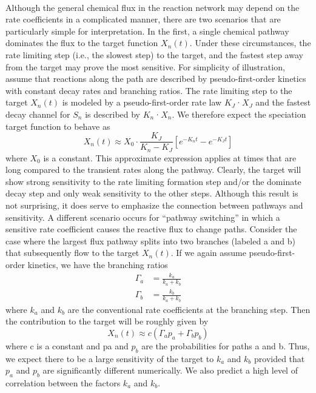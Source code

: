 \paragraph{}
Although the general chemical flux in the reaction network
may depend on the rate coefficients in a complicated manner,
there are two scenarios that are particularly simple for
interpretation. In the first, a single chemical pathway dominates
the flux to the target function $X_n(t)$. Under these circumstances,
the rate limiting step (i.e., the slowest step) to the target, and
the fastest step away from the target may prove the most
sensitive. For simplicity of illustration, assume that reactions
along the path are described by pseudo-first-order kinetics with
constant decay rates and branching ratios. The rate limiting
step to the target $X_n(t)$ is modeled by a pseudo-first-order rate
law $K_J$·$X_J$ and the fastest decay channel for $S_n$ is described by
$K_n$·$X_n$. We therefore expect the speciation target function to
behave as
\begin{equation}
\label{ch3:eqn23_X}
X_n(t) \approx X_0 \cdot \frac{K_J}{K_n - K_J} \left[e^{-K_n t} - e^{-K_J t}  \right]
\end{equation}
where $X_0$ is a constant. This approximate expression applies at
times that are long compared to the transient rates along the
pathway. Clearly, the target will show strong sensitivity to the
rate limiting formation step and/or the dominate decay step
and only weak sensitivity to the other steps. Although this
result is not surprising, it does serve to emphasize the
connection between pathways and sensitivity. A different
scenario occurs for “pathway switching” in which a sensitive
rate coefficient causes the reactive flux to change paths.
Consider the case where the largest flux pathway splits into two
branches (labeled a and b) that subsequently flow to the target $X_n(t)$. If we again assume pseudo-first-order kinetics, we have
the branching ratios
\begin{equation}
\label{ch3:eqn24_branch}
\begin{split}
\Gamma_a &= \frac{k_a}{k_a+k_b} \\
\Gamma_b &= \frac{k_b}{k_a+k_b}
\end{split}
\end{equation}
where $k_a$ and $k_b$ are the conventional rate coefficients at the
branching step. Then the contribution to the target will be
roughly given by
\begin{equation}
\label{ch3:eqn25}
X_n(t) \approx c \left( \Gamma_a p_a + \Gamma_b p_b \right)
\end{equation}
where c is a constant and pa and $p_b$ are the probabilities for
paths a and b. Thus, we expect there to be a large sensitivity of
the target to $k_a$ and $k_b$ provided that $p_a$ and $p_b$ are significantly
different numerically. We also predict a high level of correlation
between the factors $k_a$ and $k_b$.
\newline
